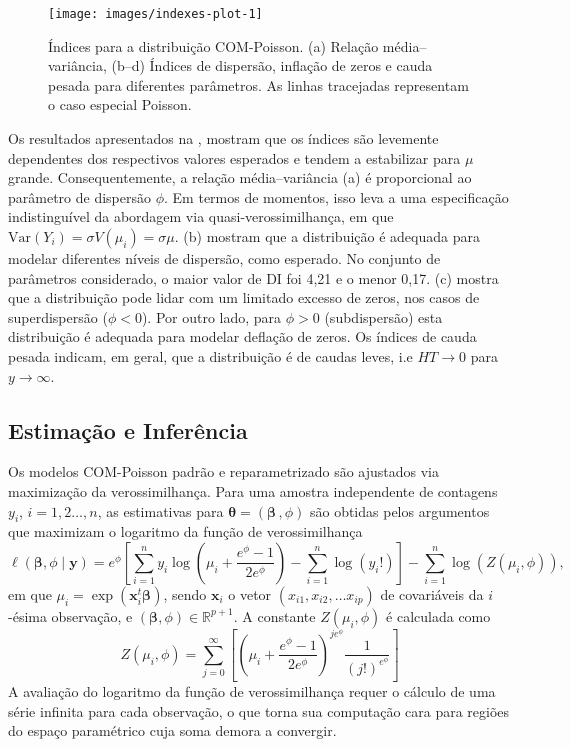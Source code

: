 \documentclass[
    oldfontcommands,
    11pt,
    openright,
    twoside,
    a4paper,
    english,
    brazil
]{abntex2}\usepackage[]{graphicx}\usepackage[]{color}
\begin{document}
\begin{figure}[!htb]

{\centering \texttt{[image: images/indexes-plot-1]} 

}

\caption[Índices para a distribuição COM-Poisson]{Índices para a distribuição COM-Poisson. (a) Relação média--variância, (b--d) Índices de dispersão, inflação de zeros e cauda pesada para diferentes parâmetros. As linhas tracejadas representam o caso especial Poisson.}\label{fig:indexes-plot}
\end{figure}



Os resultados apresentados na , mostram que os
índices são levemente dependentes dos respectivos valores esperados e
tendem a estabilizar para $\mu$ grande. Consequentemente, a relação
média--variância (a) é proporcional ao parâmetro
de dispersão $\phi$. Em termos de momentos, isso leva a uma
especificação indistinguível da abordagem via quasi-verossimilhança, em
que $\text{Var}(Y_i) = \sigma V(\mu_i) = \sigma
\mu$.
(b) mostram que a distribuição é adequada para
modelar diferentes níveis de dispersão, como esperado. No conjunto de
parâmetros considerado, o maior valor de DI foi 4,21 e o menor
0,17. (c) mostra que a distribuição pode lidar
com um limitado excesso de zeros, nos casos de superdispersão
($\phi < 0$). Por outro lado, para $\phi > 0$ (subdispersão) esta
distribuição é adequada para modelar deflação de zeros. Os índices de
cauda pesada indicam, em geral, que a distribuição é de caudas leves,
i.e $HT \to 0$ para $y \to \infty$.

\subsection{Estimação e Inferência}

Os modelos COM-Poisson padrão e reparametrizado são ajustados via
maximização da verossimilhança. Para uma amostra independente de
contagens $y_i$, $i=1,2\ldots,n$, as estimativas para
$\bm{\theta} = (\bm{\beta}\,, \phi)$ são obtidas pelos argumentos que
maximizam o logaritmo da função de verossimilhança
\begin{equation}
  \label{eqn:ll-rcmp}
  \ell(\bm{\beta}, \phi \mid \bm{y}) =
  e^\phi \left [
    \sum_{i=1}^n y_i
    \log \left( \mu_i + \frac{e^\phi-1}{2e^\phi} \right ) -
    \sum_{i=1}^n \log(y_i!) \right ] -
  \sum_{i=1}^n \log(Z(\mu_i, \phi)),
\end{equation}
em que $\mu_i = \exp(\bm{x}_i^t\bm{\beta})$, sendo $\bm{x}_i$ o vetor
$(x_{i1}, x_{i2}, \ldots x_{ip})$ de covariáveis da $i$-ésima
observação, e $(\bm{\beta}, \phi) \in \mathbb{R}^{p+1}$. A constante
$Z(\mu_i, \phi)$ é calculada como
$$
Z(\mu_i, \phi) = \sum_{j=0}^\infty \left [ \left (
    \mu_i + \frac{e^\phi - 1}{2e^\phi} \right )^{je^\phi}
  \frac{1}{(j!)^{e^\phi}} \right ]
$$
A avaliação do logaritmo da função de verossimilhança requer o cálculo
de uma série infinita para cada observação, o que torna sua computação
cara para regiões do espaço paramétrico cuja soma demora a convergir.
\end{document}
